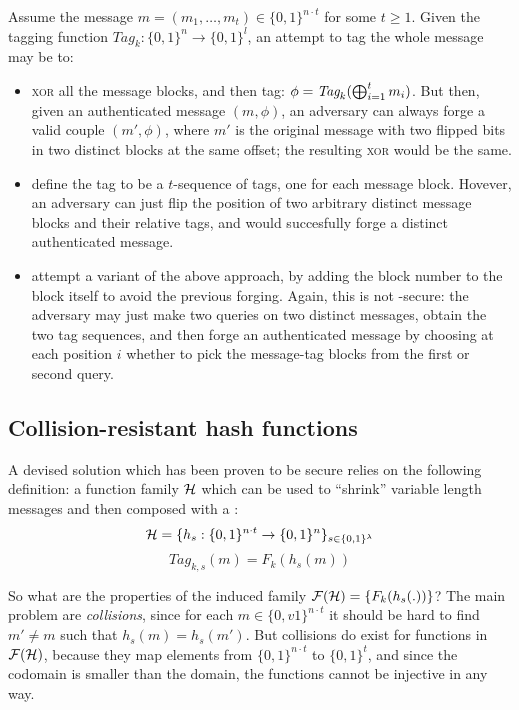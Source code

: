 Assume the message $m = (m_1, \dots, m_t) \in \{0,1\}^{n\cdot t}$ for some $t \geq 1$. Given the tagging function $\textit{Tag}_{k} : \{0, 1\}^n \to \{0, 1\}^l$, an attempt to tag the whole message may be to:

\begin{itemize}    
    \item \textsc{xor} all the message blocks, and then tag: $\phi = \textit{Tag}_k(\bigoplus_{i=1}^{t} m_i)$. But then, given an authenticated message $(m, \phi)$, an adversary can always forge a valid couple $(m', \phi)$, where $m'$ is the original message with two flipped bits in two distinct blocks at the same offset; the resulting \textsc{xor} would be the same.

    \item define the tag to be a $t$-sequence of tags, one for each message block. Hovever, an adversary can just flip the position of two arbitrary distinct message blocks and their relative tags, and would succesfully forge a distinct authenticated message.

    \item attempt a variant of the above approach, by adding the block number to the block itself to avoid the previous forging. Again, this is not \ufcma-secure: the adversary may just make two queries on two distinct messages, obtain the two tag sequences, and then forge an authenticated message by choosing at each position $i$ whether to pick the message-tag blocks from the first or second query.

\end{itemize}

\subsection{Collision-resistant hash functions}

A devised solution which has been proven to be secure relies on the following definition: a function family $\mathcal{H}$ which can be used to ``shrink'' variable length messages and then composed with a \prf{}:
\[
   \mathcal{H} = \{h_s : \{0, 1\}^{n\cdot t} \to \{0, 1\}^n \}_{s \in \{0, 1\}^\lambda}
\]
\[
   \textit{Tag}_{k, s}(m) = F_k(h_s(m))
\]

So what are the properties of the induced family $\mathcal{F}(\mathcal{H}) = \{F_{k}(h_{s}(.))\}$? The main problem are \emph{collisions}, since for each $m \in \{0,v1\}^{n\cdot t}$ it should be hard to find $m' \neq m$ such that $h_s(m) = h_s(m')$. But collisions do exist for functions in $\mathcal{F}(\mathcal{H})$, because they map elements from $\{0, 1\}^{n\cdot t} $ to $\{0,1\}^t$, and since the codomain is smaller than the domain, the functions cannot be injective in any way.

